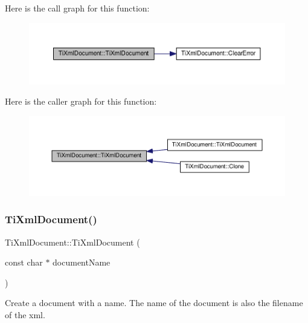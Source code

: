 Here is the call graph for this function\+:
\nopagebreak
\begin{figure}[H]
\begin{center}
\leavevmode
\includegraphics[width=350pt]{class_ti_xml_document_a9f5e84335708fde98400230f9f12659c_cgraph}
\end{center}
\end{figure}
Here is the caller graph for this function\+:
\nopagebreak
\begin{figure}[H]
\begin{center}
\leavevmode
\includegraphics[width=350pt]{class_ti_xml_document_a9f5e84335708fde98400230f9f12659c_icgraph}
\end{center}
\end{figure}
\mbox{\label{class_ti_xml_document_ae4508b452d0c3061db085f3db27b8396}} 
\subsubsection{\texorpdfstring{Ti\+Xml\+Document()}{TiXmlDocument()}\hspace{0.1cm}{\footnotesize\ttfamily [2/3]}}
{\footnotesize\ttfamily Ti\+Xml\+Document\+::\+Ti\+Xml\+Document (\begin{DoxyParamCaption}\item[{const char $\ast$}]{document\+Name }\end{DoxyParamCaption})}



Create a document with a name. The name of the document is also the filename of the xml. 

